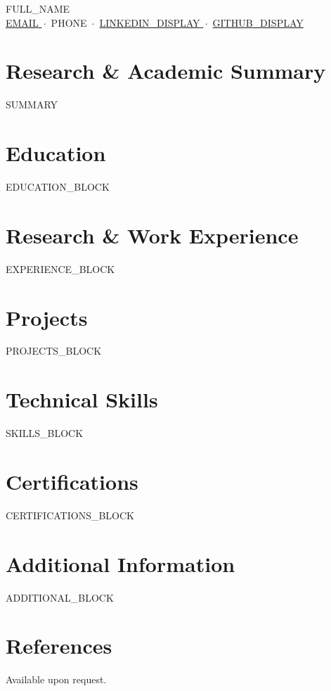 \documentclass[a4paper,11pt]{article}
\begin{document}
\begin{center}
  {\LARGE {{FULL_NAME}} }\\[5pt]
  {\small
    \href{mailto:{{EMAIL}}}{ {{EMAIL}} } \,$\cdot$\, {{PHONE}} \,$\cdot$\,
    \href{ {{LINKEDIN_URL}} }{ {{LINKEDIN_DISPLAY}} } \,$\cdot$\,
    \href{ {{GITHUB_URL}} }{ {{GITHUB_DISPLAY}} }
  }
\end{center}

\section*{Research \& Academic Summary}
{{SUMMARY}}

\section*{Education}
{{EDUCATION_BLOCK}}

\section*{Research \& Work Experience}
{{EXPERIENCE_BLOCK}}

\section*{Projects}
{{PROJECTS_BLOCK}}

\section*{Technical Skills}
{{SKILLS_BLOCK}}

\section*{Certifications}
{{CERTIFICATIONS_BLOCK}}

\section*{Additional Information}
{{ADDITIONAL_BLOCK}}

\section*{References}
Available upon request.
\end{document}
